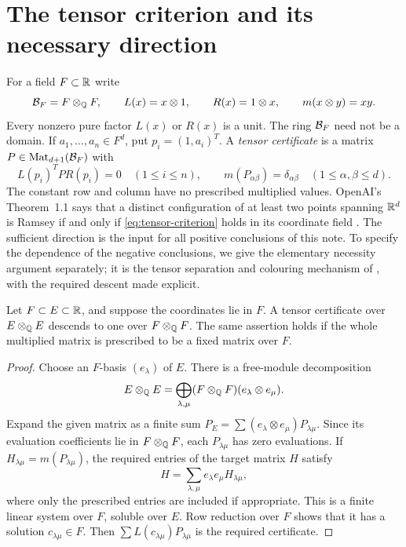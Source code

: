 \section{The tensor criterion and its necessary direction}\label{sec:tensors}

For a field $F\subset\mathbb R$ write
\[
 \mathcal B_F=F\otimes_\mathbb Q F,\qquad L(x)=x\otimes1,\qquad R(x)=1\otimes x,
 \qquad m(x\otimes y)=xy.
\]
Every nonzero pure factor $L(x)$ or $R(x)$ is a unit. The ring
$\mathcal B_F$ need not be a domain. If $a_1,\ldots,a_n\in F^d$, put
$p_i=(1,a_i)^T$. A \emph{tensor certificate} is a matrix
$P\in\operatorname{Mat}_{d+1}(\mathcal B_F)$ with
\begin{equation}\label{eq:tensor-criterion}
 L(p_i)^TPR(p_i)=0\quad(1\le i\le n),\qquad
 m(P_{\alpha\beta})=\delta_{\alpha\beta}
                   \quad(1\le\alpha,\beta\le d).
\end{equation}
The constant row and column have no prescribed multiplied values.
OpenAI's Theorem~1.1 says that a distinct configuration of at least two
points spanning $\mathbb R^d$ is Ramsey if and only if
\eqref{eq:tensor-criterion} holds in its coordinate field
\cite{openai2026}. The sufficient direction is the input for all
positive conclusions of this note. To specify the dependence of the
negative conclusions, we give the elementary necessity argument
separately; it is the tensor separation and colouring mechanism of
\cite[Section~2]{openai2026}, with the required descent made explicit.

\begin{lemma}[Descent]\label{lem:descent}
Let $F\subset E\subset\mathbb R$, and suppose the coordinates lie in $F$.
A tensor certificate over $E\otimes_\mathbb Q E$ descends to one over
$F\otimes_\mathbb Q F$. The same assertion holds if the whole multiplied
matrix is prescribed to be a fixed matrix over $F$.
\end{lemma}
\begin{proof}
Choose an $F$-basis $(e_\lambda)$ of $E$. There is a free-module
decomposition
\[
 E\otimes_\mathbb Q E=
 \bigoplus_{\lambda,\mu}(F\otimes_\mathbb Q F)(e_\lambda\otimes e_\mu).
\]
Expand the given matrix as a finite sum
$P_E=\sum(e_\lambda\otimes e_\mu)P_{\lambda\mu}$.
Since its evaluation coefficients lie in $F\otimes_\mathbb Q F$, each
$P_{\lambda\mu}$ has zero evaluations. If $H_{\lambda\mu}=m(P_{\lambda\mu})$,
the required entries of the target matrix $H$ satisfy
\[
 H=\sum_{\lambda,\mu}e_\lambda e_\mu H_{\lambda\mu},
\]
where only the prescribed entries are included if appropriate.
This is a finite linear system over $F$, soluble over $E$.
Row reduction over $F$ shows that it has a solution
$c_{\lambda\mu}\in F$. Then
$\sum L(c_{\lambda\mu})P_{\lambda\mu}$ is the required certificate.
\end{proof}

